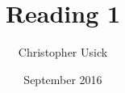\documentclass[11pt,british]{article}
\title{Reading 1}
\author{Christopher Usick }
\date{September 2016}
\newcommand{\HRule}{\rule{\linewidth}{0.5mm}}
\begin{document}
%
%

\maketitle


\begin{singlespacing}
\newpage
\printbibliography
\end{singlespacing}
\end{document}
